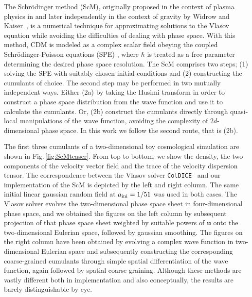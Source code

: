 \documentclass[twocolumn, nofootinbib, showpacs, superscriptaddress]{revtex4-1}
\newcommand{\vu}[0]{\bm{u} }
\begin{document}
The Schr\"odinger method (ScM), originally proposed in the context of plasma physics in \cite{BertrandVanTuanGrosEtal1980} and later independently in the context of gravity by Widrow and Kaiser~\cite{WK93,DW96},
is a numerical technique for approximating solutions to the Vlasov equation while avoiding the difficulties of dealing with phase space.
With this method, CDM is modeled as a complex scalar field obeying the coupled Schr\"odinger-Poisson 
equations (SPE) \cite{SC02,SC06,G95}, where $\hbar$ is treated as a free parameter determining the desired phase space resolution. 
The ScM comprises two steps; (1) solving the SPE  with suitably chosen initial conditions
and (2) constructing the cumulants of choice. The second step may be performed in
 two mutually independent ways. Either (2a) by taking the Husimi transform \cite{H40} in order to construct a phase space distribution 
from the wave function and use it to calculate the cumulants.  Or, (2b) construct the cumulants directly through 
quasi-local manipulations of the wave function, avoiding the complexity of $2d$-dimensional phase space.
In this work we follow the second route, that is (2b). 

 The first three cumulants of a two-dimensional toy cosmological simulation are shown in Fig.\,\ref{fig:ScMteaser}. 
From top to bottom, we show the density, the two components of the velocity vector field and the trace of the velocity dispersion tensor.
The correspondence between the Vlasov solver \texttt{ColDICE}~\cite{SousbieColombi2016} and our implementation of the  ScM is depicted 
by the left and right column.
 The same initial linear gaussian random field at $a_{\rm ini}=1/51$ was used in both cases.
The Vlasov solver evolves the two-dimensional phase space sheet in four-dimensional phase space, and we obtained the figures on the left column 
by subsequent projection of that phase space sheet weighted by suitable powers of $\vu$ onto the two-dimensional Eulerian space, 
followed by  gaussian smoothing.  The figures on the right column have been obtained by evolving a complex wave function 
in two-dimensional Eulerian space and subsequently constructing the corresponding coarse-grained cumulants through simple 
spatial differentiation of the wave function, again followed by spatial coarse graining.  Although these methods are vastly 
different both in implementation and also conceptually, the results are barely distinguishable by eye.
\end{document}
